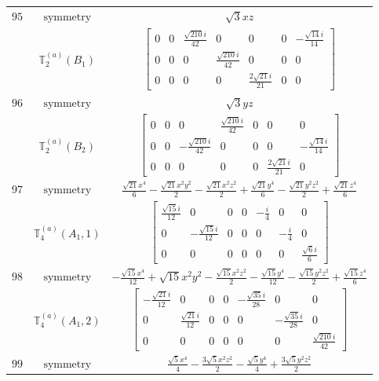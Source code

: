 \documentclass[fleqn,8pt,landscape]{jsarticle}
\begin{document}
\begin{longtable}{ccc}
$ 95 $ & $ \text{symmetry} $ & $ \sqrt{3} x z $ \\
$  $ & $ \mathbb{T}_{2}^{(a)}(B_{1}) $ & $ \begin{bmatrix} 0 & 0 & \frac{\sqrt{210} i}{42} & 0 & 0 & 0 & - \frac{\sqrt{14} i}{14} \\ 0 & 0 & 0 & \frac{\sqrt{210} i}{42} & 0 & 0 & 0 \\ 0 & 0 & 0 & 0 & \frac{2 \sqrt{21} i}{21} & 0 & 0 \end{bmatrix} $ \\ \hline
$ 96 $ & $ \text{symmetry} $ & $ \sqrt{3} y z $ \\
$  $ & $ \mathbb{T}_{2}^{(a)}(B_{2}) $ & $ \begin{bmatrix} 0 & 0 & 0 & \frac{\sqrt{210} i}{42} & 0 & 0 & 0 \\ 0 & 0 & - \frac{\sqrt{210} i}{42} & 0 & 0 & 0 & - \frac{\sqrt{14} i}{14} \\ 0 & 0 & 0 & 0 & 0 & \frac{2 \sqrt{21} i}{21} & 0 \end{bmatrix} $ \\ \hline
$ 97 $ & $ \text{symmetry} $ & $ \frac{\sqrt{21} x^{4}}{6} - \frac{\sqrt{21} x^{2} y^{2}}{2} - \frac{\sqrt{21} x^{2} z^{2}}{2} + \frac{\sqrt{21} y^{4}}{6} - \frac{\sqrt{21} y^{2} z^{2}}{2} + \frac{\sqrt{21} z^{4}}{6} $ \\
$  $ & $ \mathbb{T}_{4}^{(a)}(A_{1},1) $ & $ \begin{bmatrix} \frac{\sqrt{15} i}{12} & 0 & 0 & 0 & - \frac{i}{4} & 0 & 0 \\ 0 & - \frac{\sqrt{15} i}{12} & 0 & 0 & 0 & - \frac{i}{4} & 0 \\ 0 & 0 & 0 & 0 & 0 & 0 & \frac{\sqrt{6} i}{6} \end{bmatrix} $ \\ \hline
$ 98 $ & $ \text{symmetry} $ & $ - \frac{\sqrt{15} x^{4}}{12} + \sqrt{15} x^{2} y^{2} - \frac{\sqrt{15} x^{2} z^{2}}{2} - \frac{\sqrt{15} y^{4}}{12} - \frac{\sqrt{15} y^{2} z^{2}}{2} + \frac{\sqrt{15} z^{4}}{6} $ \\
$  $ & $ \mathbb{T}_{4}^{(a)}(A_{1},2) $ & $ \begin{bmatrix} - \frac{\sqrt{21} i}{12} & 0 & 0 & 0 & - \frac{\sqrt{35} i}{28} & 0 & 0 \\ 0 & \frac{\sqrt{21} i}{12} & 0 & 0 & 0 & - \frac{\sqrt{35} i}{28} & 0 \\ 0 & 0 & 0 & 0 & 0 & 0 & \frac{\sqrt{210} i}{42} \end{bmatrix} $ \\ \hline
$ 99 $ & $ \text{symmetry} $ & $ \frac{\sqrt{5} x^{4}}{4} - \frac{3 \sqrt{5} x^{2} z^{2}}{2} - \frac{\sqrt{5} y^{4}}{4} + \frac{3 \sqrt{5} y^{2} z^{2}}{2} $ \\

\end{longtable}
\end{document}
